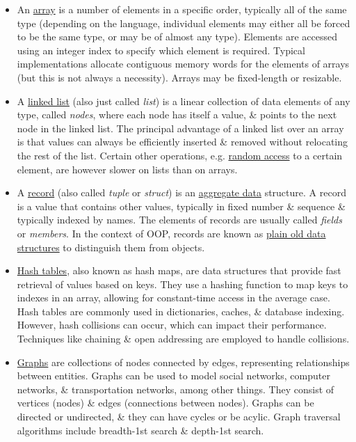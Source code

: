 \documentclass{article}
\begin{document}
\begin{itemize}
	\item An \href{https://en.wikipedia.org/wiki/Array_(data_structure)}{array} is a number of elements in a specific order, typically all of the same type (depending on the language, individual elements may either all be forced to be the same type, or may be of almost any type). Elements are accessed using an integer index to specify which element is required. Typical implementations allocate contiguous memory words for the elements of arrays (but this is not always a necessity). Arrays may be fixed-length or resizable.
	\item A \href{https://en.wikipedia.org/wiki/Linked_list}{linked list} (also just called {\it list}) is a linear collection of data elements of any type, called {\it nodes}, where each node has itself a value, \& points to the next node in the linked list. The principal advantage of a linked list over an array is that values can always be efficiently inserted \& removed without relocating the rest of the list. Certain other operations, e.g. \href{https://en.wikipedia.org/wiki/Random_access}{random access} to a certain element, are however slower on lists than on arrays.
	\item A \href{https://en.wikipedia.org/wiki/Record_(computer_science)}{record} (also called {\it tuple} or {\it struct}) is an \href{https://en.wikipedia.org/wiki/Aggregate_data}{aggregate data} structure. A record is a value that contains other values, typically in fixed number \& sequence \& typically indexed by names. The elements of records are usually called {\it fields} or {\it members}. In the context of OOP, records are known as \href{https://en.wikipedia.org/wiki/Plain_old_data_structure}{plain old data structures} to distinguish them from objects.
	\item \href{https://en.wikipedia.org/wiki/Hash_table}{Hash tables}, also known as hash maps, are data structures that provide fast retrieval of values based on keys. They use a hashing function to map keys to indexes in an array, allowing for constant-time access in the average case. Hash tables are commonly used in dictionaries, caches, \& database indexing. However, hash collisions can occur, which can impact their performance. Techniques like chaining \& open addressing are employed to handle collisions.
	\item \href{https://en.wikipedia.org/wiki/Graph_(abstract_data_type)}{Graphs} are collections of nodes connected by edges, representing relationships between entities. Graphs can be used to model social networks, computer networks, \& transportation networks, among other things. They consist of vertices (nodes) \& edges (connections between nodes). Graphs can be directed or undirected, \& they can have cycles or be acylic. Graph traversal algorithms include breadth-1st search \& depth-1st search.

\end{itemize}
\end{document}
